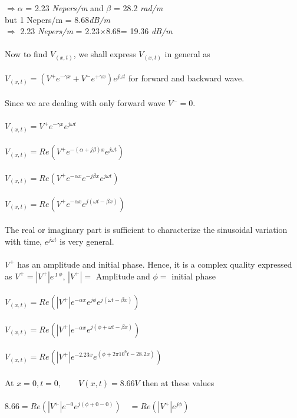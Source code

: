 $\Rightarrow \alpha$ = 2.23 \emph{Nepers/m} and $\beta$ = 28.2 \emph{rad/m}\\
but 1 Nepers/m = 8.68\emph{dB/m}\\
$\Rightarrow$ 2.23 \emph{Nepers/m} = 2.23$\times$8.68= 19.36 \emph{dB/m}\\\\
Now to find $V_{(x,t)}$, we shall express $V_{(x,t)}$ in general as \\\\
$V_{(x,t)} = (V^{+}e^{-\gamma x} + V^{-}e^{+\gamma x})e^{j\omega t}$ for forward and backward wave.\\\\
Since we are dealing with only forward wave $ V^{-} = 0 $.\\\\
$V_{(x,t)} = V^{+}e^{-\gamma x}e^{j\omega t}$\\\\
$V_{(x,t)} = Re({V^{+}e^{-(\alpha +j\beta)x}e^{j\omega t}})$\\\\
$V_{(x,t)} = Re({V^{+}e^{-\alpha x}e^{-j\beta x}e^{j\omega t}})$\\\\
$V_{(x,t)} = Re({V^{+}e^{-\alpha x}e^{j(\omega t - \beta x)}})$\\\\The real or imaginary part is sufficient to characterize the sinusoidal variation with time, ${e^{j\omega t}}$ is very general.\\\\
${V^+}$ has an amplitude and initial phase. Hence, it is a complex quality expressed as $ V^{+} = |V^{+}|e^{\jmath\phi} $, $ |V^{+}| =$ Amplitude and $ \phi =$ initial phase\\\\
$V_{(x,t)} = Re({|V^{+}|e^{-\alpha x}e^{j\phi}e^{j(\omega t - \beta x)}})$\\\\
$V_{(x,t)} = Re({|V^{+}|e^{-\alpha x}e^{j(\phi+\omega t - \beta x)}})$\\\\
$V_{(x,t)} = Re({|V^{+}|e^{-2.23x}e^{(\phi+2\pi10^9t-28.2x)}})$\\\\
At $ x = 0, t = 0, \quad \quad V(x,t) = 8.66V $ then at these values\\\\ 
$8.66 = Re({|V^{+}|e^{-0}e^{j(\phi+0-0)}}) \quad = Re({|V^+|}e^{j\phi})$\\\\
